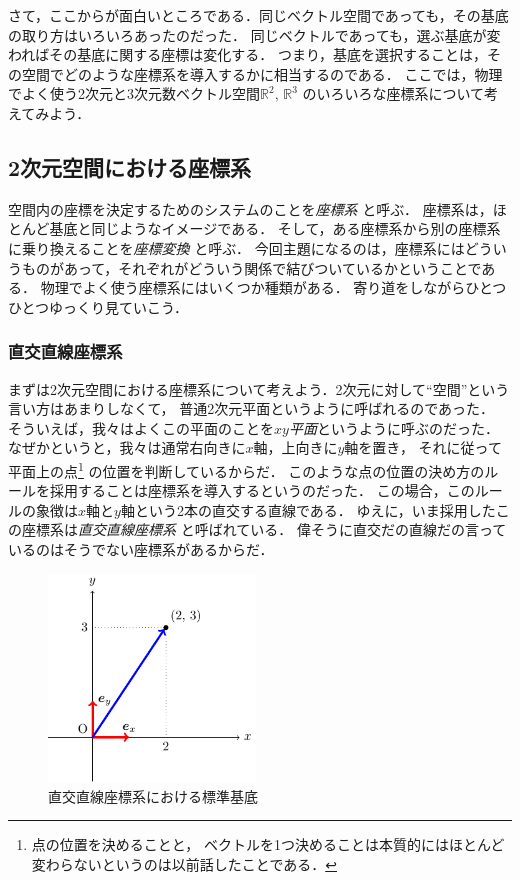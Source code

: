 さて，ここからが面白いところである．同じベクトル空間であっても，その基底の取り方はいろいろあったのだった．
同じベクトルであっても，選ぶ基底が変わればその基底に関する座標は変化する．
つまり，基底を選択することは，その空間でどのような座標系を導入するかに相当するのである．
ここでは，物理でよく使う2次元と3次元数ベクトル空間$\mathbb{R}^2, \, \mathbb{R}^3$
のいろいろな座標系について考えてみよう．
\subsection{2次元空間における座標系}
空間内の座標を決定するためのシステムのことを\emph{座標系}
と呼ぶ．
座標系は，ほとんど基底と同じようなイメージである．
そして，ある座標系から別の座標系に乗り換えることを\emph{座標変換}
と呼ぶ．
今回主題になるのは，座標系にはどういうものがあって，それぞれがどういう関係で結びついているかということである．
物理でよく使う座標系にはいくつか種類がある．
寄り道をしながらひとつひとつゆっくり見ていこう．
\subsubsection{直交直線座標系}
まずは2次元空間における座標系について考えよう．2次元に対して``空間''という言い方はあまりしなくて，
普通2次元平面というように呼ばれるのであった．
そういえば，我々はよくこの平面のことを\emph{$xy$平面}というように呼ぶのだった．
なぜかというと，我々は通常右向きに$x$軸，上向きに$y$軸を置き，
それに従って平面上の点\footnote{点の位置を決めることと，
ベクトルを1つ決めることは本質的にはほとんど変わらないというのは以前話したことである．}
の位置を判断しているからだ．
このような点の位置の決め方のルールを採用することは座標系を導入するというのだった．
この場合，このルールの象徴は$x$軸と$y$軸という2本の直交する直線である．
ゆえに，いま採用したこの座標系は\emph{直交直線座標系}
と呼ばれている．
偉そうに直交だの直線だの言っているのはそうでない座標系があるからだ．
\begin{figure}[h]
 \begin{center}
 \includegraphics[width=5.5cm]{picture/vecter8.pdf}
 \caption{直交直線座標系における標準基底}
 \end{center}
\end{figure}

